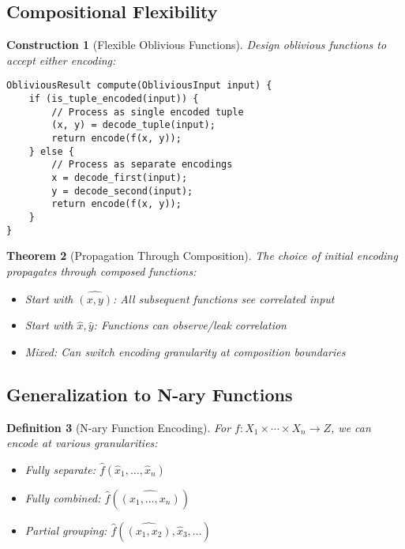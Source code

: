 \documentclass[11pt,final]{article}
\newtheorem{theorem}{Theorem}[section]
\newtheorem{definition}[theorem]{Definition}
\newtheorem{construction}[theorem]{Construction}
\begin{document}
\subsection{Compositional Flexibility}

\begin{construction}[Flexible Oblivious Functions]
Design oblivious functions to accept either encoding:
\begin{verbatim}
ObliviousResult compute(ObliviousInput input) {
    if (is_tuple_encoded(input)) {
        // Process as single encoded tuple
        (x, y) = decode_tuple(input);
        return encode(f(x, y));
    } else {
        // Process as separate encodings
        x = decode_first(input);
        y = decode_second(input);
        return encode(f(x, y));
    }
}
\end{verbatim}
\end{construction}

\begin{theorem}[Propagation Through Composition]
The choice of initial encoding propagates through composed functions:
\begin{itemize}
    \item Start with $\widehat{(x,y)}$: All subsequent functions see correlated input
    \item Start with $\hat{x}, \hat{y}$: Functions can observe/leak correlation
    \item Mixed: Can switch encoding granularity at composition boundaries
\end{itemize}
\end{theorem}

\subsection{Generalization to N-ary Functions}

\begin{definition}[N-ary Function Encoding]
For $f: X_1 \times \cdots \times X_n \to Z$, we can encode at various granularities:
\begin{itemize}
    \item Fully separate: $\hat{f}(\hat{x}_1, \ldots, \hat{x}_n)$
    \item Fully combined: $\hat{f}(\widehat{(x_1, \ldots, x_n)})$
    \item Partial grouping: $\hat{f}(\widehat{(x_1, x_2)}, \hat{x}_3, \ldots)$
\end{itemize}
\end{definition}
\end{document}
